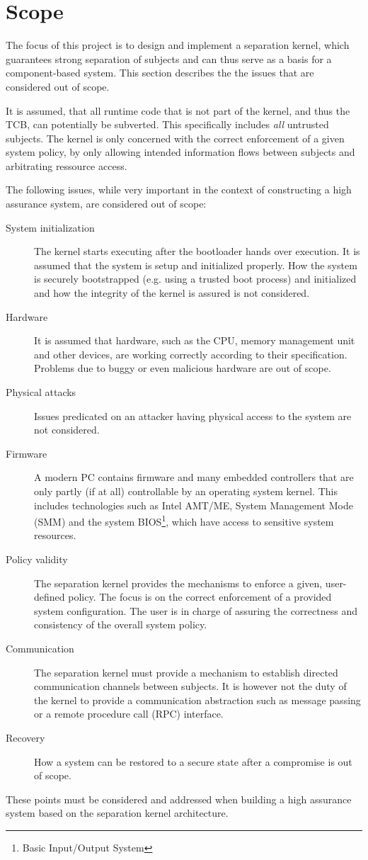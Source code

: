 \section{Scope}
The focus of this project is to design and implement a separation kernel, which
guarantees strong separation of subjects and can thus serve as a basis for a
component-based system. This section describes the the issues that are
considered out of scope.

It is assumed, that all runtime code that is not part of the kernel, and thus
the TCB, can potentially be subverted. This specifically includes \emph{all}
untrusted subjects. The kernel is only concerned with the correct enforcement of
a given system policy, by only allowing intended information flows between
subjects and arbitrating ressource access.

The following issues, while very important in the context of constructing a
high assurance system, are considered out of scope:

\begin{description}
	\item[System initialization] The kernel starts executing after the
		bootloader hands over execution. It is assumed that the system is setup
		and initialized properly. How the system is securely bootstrapped (e.g.
		using a trusted boot process) and initialized and how the integrity of
		the kernel is assured is not considered.
	\item[Hardware] It is assumed that hardware, such as the CPU, memory
		management unit and other devices, are working correctly according to
		their specification. Problems due to buggy or even malicious hardware
		are out of scope.
	\item[Physical attacks] Issues predicated on an attacker having physical
		access to the system are not considered.
	\item[Firmware] A modern PC contains firmware and many embedded controllers
		that are only partly (if at all) controllable by an operating system
		kernel. This includes technologies such as Intel AMT/ME, System
		Management Mode (SMM) and the system BIOS\footnote{Basic
		Input/Output System}, which have access to sensitive system resources.
	\item[Policy validity] The separation kernel provides the mechanisms to
		enforce a given, user-defined policy. The focus is on the correct
		enforcement of a provided system configuration. The user is in charge of
		assuring the correctness and consistency of the overall system policy.
	\item[Communication] The separation kernel must provide a mechanism to
		establish directed communication channels between subjects.	It is
		however not the duty of the kernel to provide a	communication
		abstraction such as message passing or a remote procedure call (RPC)
		interface.
	\item[Recovery] How a system can be restored to a secure state after a
		compromise is out of scope.
\end{description}

These points must be considered and addressed when building a high assurance
system based on the separation kernel architecture.
